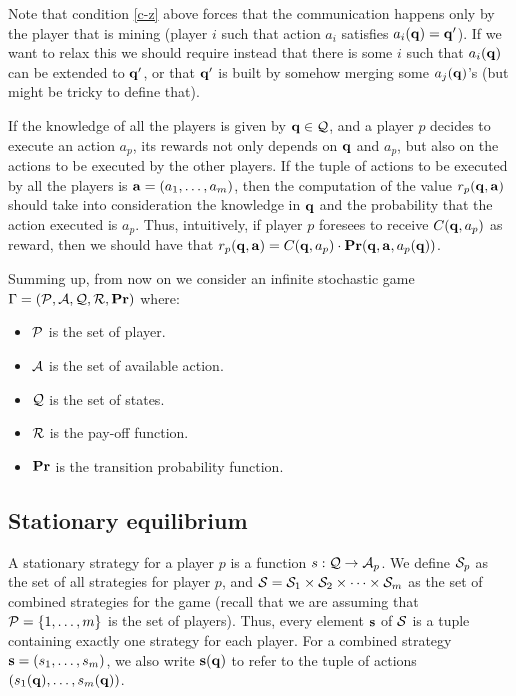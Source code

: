 Note that condition \ref{c-z} above forces that the communication happens only by the player that is mining (player $i$ such that 
action $a_i$ satisfies $a_i(\mathbf{q}) = \mathbf{q}'$). If we want to relax this we should require instead that there is some $i$ such that $a_i(\mathbf{q})$ can be extended to $\mathbf{q}'$, or that $\mathbf{q}'$ is built by somehow merging some $a_j(\mathbf{q})$'s (but might be tricky to define that).


If the knowledge of all the players is given by $\mathbf{q} \in \mathcal{Q}$, and a player $p$ decides to execute an action $a_p$, its rewards not only depends on $\mathbf{q}$ and $a_p$, but also on the actions to be executed by the other players. If the tuple of actions to be executed by all the players is $\mathbf{a} = (a_1, \ldots, a_m)$, then the computation of the value $r_p(\mathbf{q}, \mathbf{a})$ should take into consideration the knowledge in $\mathbf{q}$ and the probability that the action executed is $a_p$. Thus, intuitively, if player $p$ foresees to receive $C(\mathbf{q}, a_p)$ as reward, then we should have that $r_p(\mathbf{q}, \mathbf{a}) = C(\mathbf{q}, a_p) \cdot \mathbf{Pr}(\mathbf{q}, \mathbf{a}, a_p(\mathbf{q}))$.


Summing up, from now on we consider an infinite stochastic game $\Gamma = (\mathcal{P},\mathcal{A},\mathcal{Q},\mathcal{R},\mathbf{Pr})$ where:
\begin{itemize}
	\item $\mathcal{P}$ is the set of player.
	\item $\mathcal{A}$ is the set of available action.
	\item $\mathcal{Q}$ is the set of states.
	\item $\mathcal{R}$ is the pay-off function.
	\item $\mathbf{Pr}$ is the transition probability function.
\end{itemize} 


\subsection{Stationary equilibrium}

A stationary strategy for a player $p$ is a function $s : \mathcal{Q} \rightarrow \mathcal{A}_p$. 
We define $\mathcal{S}_p$ as the set of all strategies for player $p$, and $\mathcal{S} = \mathcal{S}_{1} \times \mathcal{S}_{2} \times \cdots \times \mathcal{S}_{m}$ as the set of combined strategies for the game (recall that we are assuming that $\mathcal{P} = \{1, \ldots, m\}$ is the set of players). Thus, every element $\mathbf{s}$ of $\mathcal{S}$ is a tuple containing exactly one strategy for each player. 
For a combined strategy $\mathbf{s} = (s_1, \ldots, s_m)$, 
we also write $\mathbf{s}(\mathbf{q})$ to refer to the tuple of actions $(s_1(\mathbf{q}), \ldots, s_m(\mathbf{q}))$. 

